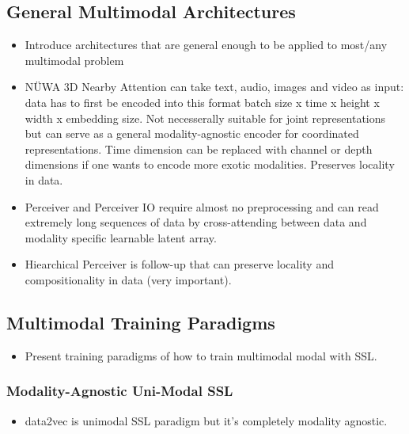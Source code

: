 \documentclass[
]{krantz}
\providecommand{\tightlist}{%
  \setlength{\itemsep}{0pt}\setlength{\parskip}{0pt}}
\begin{document}
\hypertarget{general-multimodal-architectures}{%
\subsection{General Multimodal Architectures}\label{general-multimodal-architectures}}

\begin{itemize}
\tightlist
\item
  Introduce architectures that are general enough to be applied to most/any multimodal problem
\item
  NÜWA 3D Nearby Attention can take text, audio, images and video as input: data has to first be encoded into this format batch size x time x height x width x embedding size. Not necesserally suitable for joint representations but can serve as a general modality-agnostic encoder for coordinated representations. Time dimension can be replaced with channel or depth dimensions if one wants to encode more exotic modalities. Preserves locality in data.
\item
  Perceiver and Perceiver IO require almost no preprocessing and can read extremely long sequences of data by cross-attending between data and modality specific learnable latent array.
\item
  Hiearchical Perceiver is follow-up that can preserve locality and compositionality in data (very important).
\end{itemize}

\hypertarget{multimodal-training-paradigms}{%
\subsection{Multimodal Training Paradigms}\label{multimodal-training-paradigms}}

\begin{itemize}
\tightlist
\item
  Present training paradigms of how to train multimodal modal with SSL.
\end{itemize}

\hypertarget{modality-agnostic-uni-modal-ssl}{%
\subsubsection{Modality-Agnostic Uni-Modal SSL}\label{modality-agnostic-uni-modal-ssl}}

\begin{itemize}
\tightlist
\item
  data2vec is unimodal SSL paradigm but it's completely modality agnostic.
\end{itemize}
\end{document}
